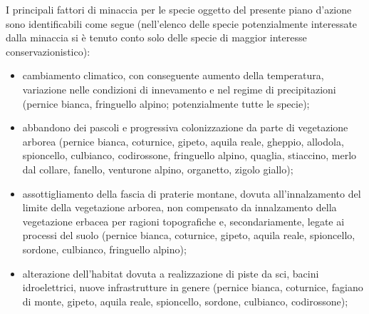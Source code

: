 \documentclass[10pt,twoside,openany,x11names,svgnames,italian,a5paper,dvipsnames,table]{memoir}
\begin{document}
I principali fattori di minaccia per le specie oggetto del presente piano d'azione sono identificabili come segue (nell’elenco delle specie potenzialmente interessate dalla minaccia si è tenuto conto solo delle specie di maggior interesse conservazionistico):
\begin{itemize}\itemsep0pt
  \item cambiamento climatico, con conseguente aumento della temperatura, variazione nelle condizioni di innevamento e nel regime di precipitazioni (pernice bianca, fringuello alpino; potenzialmente tutte le specie);
  \item abbandono dei pascoli e progressiva colonizzazione da parte di vegetazione arborea (pernice bianca, coturnice, gipeto, aquila reale, gheppio, allodola, spioncello, culbianco, codirossone, fringuello alpino, quaglia, stiaccino, merlo dal collare, fanello, venturone alpino, organetto, zigolo giallo);
  \item assottigliamento della fascia di praterie montane, dovuta all'innalzamento del limite della vegetazione arborea, non compensato da innalzamento della vegetazione erbacea per ragioni topografiche e, secondariamente, legate ai processi del suolo (pernice bianca, coturnice, gipeto, aquila reale, spioncello, sordone, culbianco, fringuello alpino);
  \item alterazione dell’habitat dovuta a realizzazione di piste da sci, bacini idroelettrici, nuove infrastrutture in genere (pernice bianca, coturnice, fagiano di monte, gipeto, aquila reale, spioncello, sordone, culbianco, codirossone);

\end{itemize}
\end{document}
